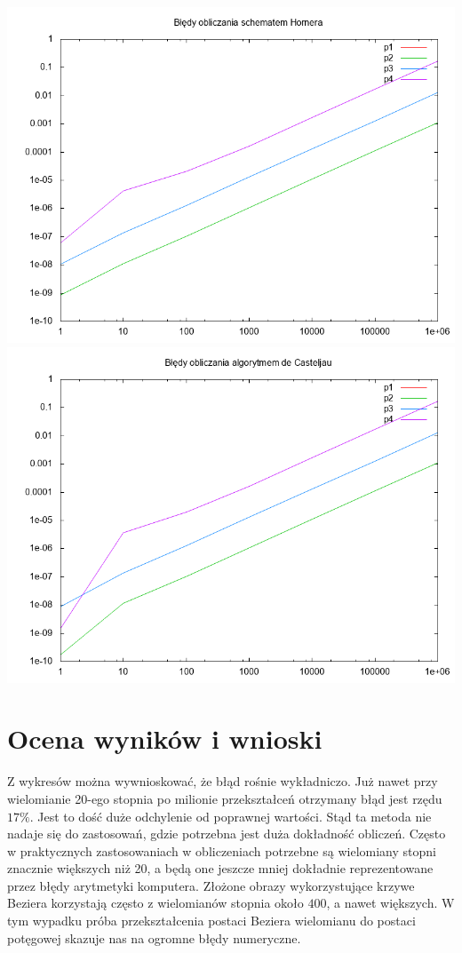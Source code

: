 \documentclass[wide, 11pt]{mwart}
\begin{document}
\includegraphics*[width=\linewidth]{hornerplot}
\includegraphics*[width=\linewidth]{decasteljauplot}

\section{Ocena wyników i wnioski}
Z wykresów można wywnioskować, że błąd rośnie wykładniczo. Już nawet przy wielomianie 20-ego stopnia po milionie przekształceń otrzymany błąd jest rzędu $17\%$. Jest to dość duże odchylenie od poprawnej wartości. Stąd ta metoda nie nadaje się do zastosowań, gdzie potrzebna jest duża dokładność obliczeń. Często w praktycznych zastosowaniach w obliczeniach potrzebne są wielomiany stopni znacznie większych niż 20, a będą one jeszcze mniej dokładnie reprezentowane przez błędy arytmetyki komputera. Złożone obrazy wykorzystujące krzywe Beziera korzystają często z wielomianów stopnia około $400$, a nawet większych. W tym wypadku próba przekształcenia postaci Beziera wielomianu do postaci potęgowej skazuje nas na ogromne błędy numeryczne.
\end{document}
